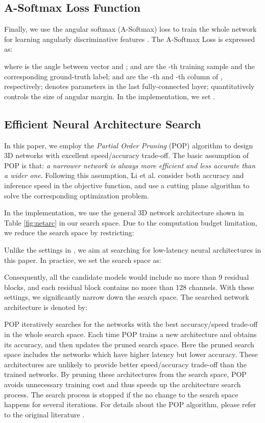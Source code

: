 \documentclass[final,5p,times,twocolumn]{elsarticle}
\begin{document}
\subsection{A-Softmax Loss Function}
\label{ssec:obj}
Finally, we use the angular softmax (A-Softmax) loss to train the whole network for learning angularly discriminative features \citep{Liu2017SphereFace}. The A-Softmax Loss is expressed as:

where  is the angle between vector  and ;  and  are the -th training sample and the corresponding ground-truth label;  and  are the -th and -th column of , respectively;  denotes parameters in the last fully-connected layer;  quantitatively controls the size of angular margin. In the implementation, we set .


\subsection{Efficient Neural Architecture Search}
\label{ssec:3dnas}

In this paper, we employ the \emph{Partial Order Pruning} (POP) \citep{li2019partial} algorithm to design 3D networks with excellent speed/accuracy trade-off. The basic assumption of POP is that: \textit{a narrower network is always more efficient and less accurate than a wider one}. Following this assumption, Li et al. consider both accuracy and inference speed in the objective function, and use a cutting plane algorithm to solve the corresponding optimization problem. 

In the implementation, we use the general 3D network architecture shown in Table \ref{fig:netarc} in our search space. 
Due to the computation budget limitation, we reduce the search space by restricting:
 
Unlike the settings in \citep{li2019partial}, we aim at searching for low-latency neural architectures in this paper. In practice, we set the search space as: 

Consequently, all the candidate models would include no more than 9 residual blocks, and each residual block contains no more than 128 channels. With these settings, we significantly narrow down the search space. 
The searched network architecture is denoted by:



POP iteratively searches for the networks with the best accuracy/speed trade-off in the whole search space. Each time POP trains a new architecture and obtains its accuracy, and then updates the pruned search space. Here the pruned search space includes the networks which have higher latency but lower accuracy. These architectures are unlikely to provide better speed/accuracy trade-off than the trained networks. By pruning these architectures from the search space, POP avoids unnecessary training cost and thus speeds up the architecture search process. The search process is stopped if the no change to the search space happens for several iterations. For details about the POP algorithm, please refer to the original literature \citep{li2019partial}. 
\end{document}
